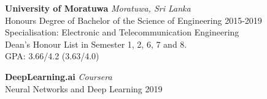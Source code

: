 \documentclass[a4paper,11pt]{article}
\begin{document}
 
{{\bf University of Moratuwa} \hfill {\em Moratuwa, Sri Lanka} 
\\{\normalsize Honours Degree of Bachelor of the Science of Engineering} \hfill
 2015-2019
 \\ \small Specialisation: Electronic and Telecommunication Engineering \hfill $\;$
 \\ Dean's Honour List in Semester 1, 2, 6, 7 and 8. \hfill $\;$
 \\{\normalsize GPA: 3.66/4.2 (3.63/4.0)} \hfill}
 
\vspace{0.05in}
{{\bf DeepLearning.ai} \hfill {\em Coursera} 
\\{\normalsize Neural Networks and Deep Learning} \hfill
 2019 }
%  






\vspace{0.05in}
\end{document}
